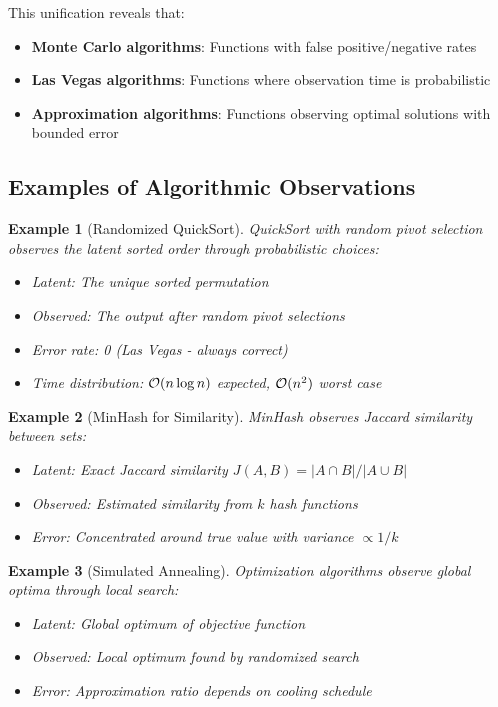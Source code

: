 \documentclass[11pt]{article}
\newtheorem{example}{Example}
\begin{document}
This unification reveals that:
\begin{itemize}
\item \textbf{Monte Carlo algorithms}: Functions with false positive/negative rates
\item \textbf{Las Vegas algorithms}: Functions where observation time is probabilistic
\item \textbf{Approximation algorithms}: Functions observing optimal solutions with bounded error
\end{itemize}

\subsection{Examples of Algorithmic Observations}

\begin{example}[Randomized QuickSort]
QuickSort with random pivot selection observes the latent sorted order through probabilistic choices:
\begin{itemize}
\item Latent: The unique sorted permutation
\item Observed: The output after random pivot selections
\item Error rate: 0 (Las Vegas - always correct)
\item Time distribution: $\mathcal{O}(n \log n)$ expected, $\mathcal{O}(n^2)$ worst case
\end{itemize}
\end{example}

\begin{example}[MinHash for Similarity]
MinHash observes Jaccard similarity between sets:
\begin{itemize}
\item Latent: Exact Jaccard similarity $J(A,B) = |A \cap B|/|A \cup B|$
\item Observed: Estimated similarity from $k$ hash functions
\item Error: Concentrated around true value with variance $\propto 1/k$
\end{itemize}
\end{example}

\begin{example}[Simulated Annealing]
Optimization algorithms observe global optima through local search:
\begin{itemize}
\item Latent: Global optimum of objective function
\item Observed: Local optimum found by randomized search
\item Error: Approximation ratio depends on cooling schedule
\end{itemize}
\end{example}
\end{document}

